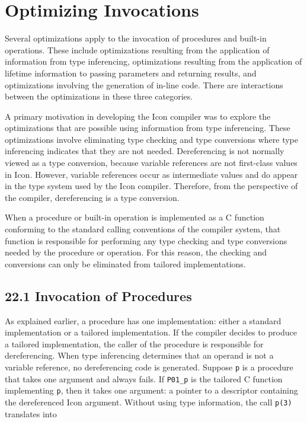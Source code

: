 \chapter{Optimizing Invocations}

Several optimizations apply to the invocation of procedures and
built-in operations. These include optimizations resulting from the
application of information from type inferencing, optimizations
resulting from the application of lifetime information to passing
parameters and returning results, and optimizations involving the
generation of in-line code. There are interactions between the
optimizations in these three categories.

A primary motivation in developing the Icon compiler was to explore
the optimizations that are possible using information from type
inferencing. These optimizations involve eliminating type checking and
type conversions where type inferencing indicates that they are not
needed. Dereferencing is not normally viewed as a type conversion,
because variable references are not first-class values in
Icon. However, variable references occur as intermediate values and do
appear in the type system used by the Icon compiler. Therefore, from
the perspective of the compiler, dereferencing is a type conversion.

When a procedure or built-in operation is implemented as a C function
conforming to the standard calling conventions of the compiler system,
that function is responsible for performing any type checking and type
conversions needed by the procedure or operation. For this reason, the
checking and conversions can only be eliminated from tailored
implementations.


\section[22.1 Invocation of Procedures]{22.1 Invocation of Procedures}

As explained earlier, a procedure has one implementation: either a
standard implementation or a tailored implementation.  If the compiler
decides to produce a tailored implementation, the caller of the
procedure is responsible for dereferencing. When type inferencing
determines that an operand is not a variable reference, no
dereferencing code is generated. Suppose \texttt{p} is a procedure
that takes one argument and always fails. If \texttt{P01\_p} is the
tailored C function implementing \texttt{p}, then it takes one
argument: a pointer to a descriptor containing the dereferenced Icon
argument.  Without using type information, the call \texttt{p(3)}
translates into

